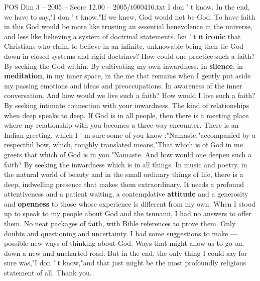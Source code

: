 \begin{textsample}{POS Dim 3 – 2005 – Score 12.00 – 2005/t000416.txt}
I don ' t know.
In the end, we have to say,"I don ' t know."If we knew, God would not be God.
To have faith in this God would be more like trusting an essential benevolence in the universe, and less like believing a system of doctrinal statements.
Isn ' t it \textbf{ironic} that Christians who claim to believe in an infinite, unknowable being then tie God down in closed systems and rigid doctrines?
How could one practice such a faith?
By seeking the God within.
By cultivating my own inwardness.
In \textbf{silence}, in \textbf{meditation}, in my inner space, in the me that remains when I gently put aside my passing emotions and ideas and preoccupations.
In awareness of the inner conversation.
And how would we live such a faith?
How would I live such a faith?
By seeking intimate connection with your inwardness.
The kind of relationships when deep speaks to deep.
If God is in all people, then there is a meeting place where my relationship with you becomes a three-way encounter.
There is an Indian greeting, which I ' m sure some of you know :"Namaste,"accompanied by a respectful bow, which, roughly translated means,"That which is of God in me greets that which of God is in you."Namaste.
And how would one deepen such a faith?
By seeking the inwardness which is in all things.
In music and poetry, in the natural world of beauty and in the small ordinary things of life, there is a deep, indwelling presence that makes them extraordinary.
It needs a profound attentiveness and a patient waiting, a contemplative \textbf{attitude} and a generosity and \textbf{openness} to those whose experience is different from my own.
When I stood up to speak to my people about God and the tsunami, I had no answers to offer them.
No neat packages of faith, with Bible references to prove them.
Only doubts and questioning and uncertainty.
I had some suggestions to make — possible new ways of thinking about God.
Ways that might allow us to go on, down a new and uncharted road.
But in the end, the only thing I could say for sure was,"I don ' t know,"and that just might be the most profoundly religious statement of all.
Thank you.

\end{textsample}
